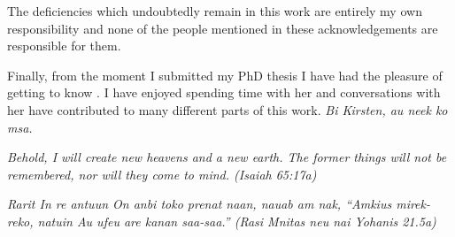 \begin{refsection}
The deficiencies which undoubtedly remain in this
work are entirely my own responsibility
and none of the people mentioned in
these acknowledgements are responsible for them.

Finally, from the moment I submitted my PhD thesis
I have had the pleasure of getting to know .
I have enjoyed spending time with her and conversations
with her have contributed to many different parts of this work.
\it{Bi Kirsten, au {\Q}neek ko msa{\Q}.}

\vspace{\baselineskip}

\noindent
\it{Behold, I will create new heavens and a new earth.
The former things will not be remembered,
nor will they come to mind.}
\hfill(Isaiah 65:17a)

\vspace{\baselineskip}

\noindent
\it{Rarit In re{\Q} antuun On anbi {\Q}toko prenat naan, na{\Q}uab am nak,
``Amkius mirek-reko{\Q}, natuin Au u{\Q}fe{\Q}u are{\Q} kanan saa{\Q}-saa{\Q}.''}
\hfill{(Rasi Mnitas neu nai{\Q} Yohanis 21.5a)}

\end{refsection}

